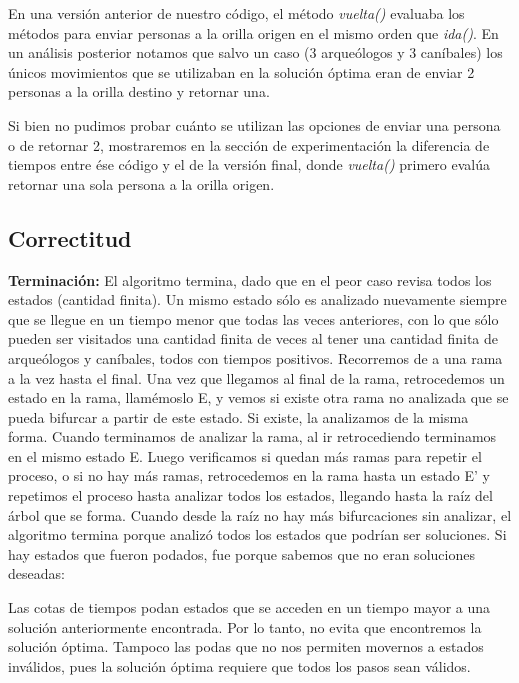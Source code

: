 En una versión anterior de nuestro código, el método \textit{vuelta()} evaluaba los métodos para enviar personas a la orilla origen en el mismo orden que \textit{ida()}.
En un análisis posterior notamos que salvo un caso (3 arqueólogos y 3 caníbales) los únicos movimientos que se utilizaban en la solución óptima eran de enviar 2 personas a la orilla destino y retornar una. 

Si bien no pudimos probar cuánto se utilizan las opciones de enviar una persona o de retornar 2, mostraremos en la sección de experimentación la diferencia de tiempos entre ése código y el de la versión final, donde \textit{vuelta()} primero evalúa retornar una sola persona a la orilla origen.

\subsection{Correctitud}

\textbf{Terminación:} El algoritmo termina, dado que en el peor caso revisa todos los estados (cantidad finita). Un mismo estado sólo es analizado nuevamente siempre que se llegue en un tiempo menor que todas las veces anteriores, con lo que sólo pueden ser visitados una cantidad finita de veces al tener una cantidad finita de arque\'ologos y can\'ibales, todos con tiempos positivos.
Recorremos de a una rama a la vez hasta el final. Una vez que llegamos al final de la rama, retrocedemos un estado en la rama, llamémoslo E, y vemos si existe otra rama no analizada que se pueda bifurcar a partir de este estado. Si existe, la analizamos de la misma forma. Cuando terminamos de analizar la rama, al ir retrocediendo terminamos en el mismo estado E. Luego verificamos si quedan más ramas para repetir el proceso, o si no hay más ramas, retrocedemos en la rama hasta un estado E' y repetimos el proceso hasta analizar todos los estados, llegando hasta la raíz del árbol que se forma. Cuando desde la raíz no hay más bifurcaciones sin analizar, el algoritmo termina porque analizó todos los estados que podrían ser soluciones. Si hay estados que fueron podados, fue porque sabemos que no eran soluciones deseadas:

Las cotas de tiempos podan estados que se acceden en un tiempo mayor a una solución anteriormente encontrada.
Por lo tanto, no evita que encontremos la solución óptima. 
Tampoco las podas que no nos permiten movernos a estados inválidos, pues la solución óptima requiere que todos los pasos sean válidos.
 \\
 
